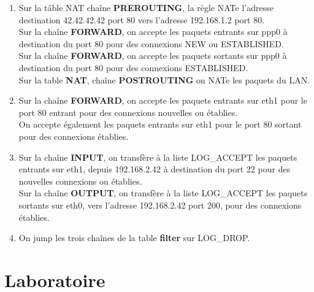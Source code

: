 \documentclass[a4paper,10pt,final,fleqn]{article}
\begin{document}
\begin{enumerate}
				\item Sur la tâble NAT chaîne \textbf{PREROUTING}, la règle NATe l'adresse destination 42.42.42.42 port 80 vers l'adresse 192.168.1.2 port 80.\\
				Sur la chaîne \textbf{FORWARD}, on accepte les paquets entrants sur ppp0 à destination du port 80 pour des connexions NEW ou ESTABLISHED.\\
				Sur la chaîne \textbf{FORWARD}, on accepte les paquets sortants sur ppp0 à destination du port 80 pour des connexions ESTABLISHED.\\
				Sur la table \textbf{NAT}, chaîne \textbf{POSTROUTING} on NATe les paquets du LAN.\\
				\item Sur la chaîne \textbf{FORWARD}, on accepte les paquets entrants sur eth1 pour le port 80 entrant pour des connexions nouvelles ou établies.\\
				On accepte également les paquets entrants sur eth1 pour le port 80 sortant pour des connexions établies.\\
				\item Sur la chaîne \textbf{INPUT}, on transfère à la liste LOG\_ACCEPT les paquets entrants sur eth1, depuis 192.168.2.42 à destination du port 22 pour des nouvelles connexions ou établies.\\
				Sur la chaîne \textbf{OUTPUT}, on transfère à la liste LOG\_ACCEPT les paquets sortants sur eth0, vers l'adresse 192.168.2.42 port 200, pour des connexions établies.\\
				\item On jump les trois chaînes de la table \textbf{filter} sur LOG\_DROP.
			\end{enumerate}

	\section{Laboratoire}
\end{document}
